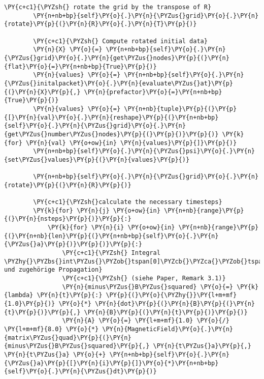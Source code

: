 \begin{Verbatim}[commandchars=\\\{\}]
        \PY{c+c1}{\PYZsh{} rotate the grid by the transpose of R}
        \PY{n+nb+bp}{self}\PY{o}{.}\PY{n}{\PYZus{}grid}\PY{o}{.}\PY{n}{rotate}\PY{p}{(}\PY{n}{R}\PY{o}{.}\PY{n}{T}\PY{p}{)}

        \PY{c+c1}{\PYZsh{} Compute rotated initial data}
        \PY{n}{X} \PY{o}{=} \PY{n+nb+bp}{self}\PY{o}{.}\PY{n}{\PYZus{}grid}\PY{o}{.}\PY{n}{get\PYZus{}nodes}\PY{p}{(}\PY{n}{flat}\PY{o}{=}\PY{n+nb+bp}{True}\PY{p}{)}
        \PY{n}{values} \PY{o}{=} \PY{n+nb+bp}{self}\PY{o}{.}\PY{n}{\PYZus{}initalpacket}\PY{o}{.}\PY{n}{evaluate\PYZus{}at}\PY{p}{(}\PY{n}{X}\PY{p}{,} \PY{n}{prefactor}\PY{o}{=}\PY{n+nb+bp}{True}\PY{p}{)}
        \PY{n}{values} \PY{o}{=} \PY{n+nb}{tuple}\PY{p}{(}\PY{p}{[}\PY{n}{val}\PY{o}{.}\PY{n}{reshape}\PY{p}{(}\PY{n+nb+bp}{self}\PY{o}{.}\PY{n}{\PYZus{}grid}\PY{o}{.}\PY{n}{get\PYZus{}number\PYZus{}nodes}\PY{p}{(}\PY{p}{)}\PY{p}{)} \PY{k}{for} \PY{n}{val} \PY{o+ow}{in} \PY{n}{values}\PY{p}{]}\PY{p}{)}
        \PY{n+nb+bp}{self}\PY{o}{.}\PY{n}{\PYZus{}psi}\PY{o}{.}\PY{n}{set\PYZus{}values}\PY{p}{(}\PY{n}{values}\PY{p}{)}

        \PY{n+nb+bp}{self}\PY{o}{.}\PY{n}{\PYZus{}grid}\PY{o}{.}\PY{n}{rotate}\PY{p}{(}\PY{n}{R}\PY{p}{)}

        \PY{c+c1}{\PYZsh{}calculate the necessary timesteps}
        \PY{k}{for} \PY{n}{j} \PY{o+ow}{in} \PY{n+nb}{range}\PY{p}{(}\PY{n}{nsteps}\PY{p}{)}\PY{p}{:}
            \PY{k}{for} \PY{n}{i} \PY{o+ow}{in} \PY{n+nb}{range}\PY{p}{(}\PY{n+nb}{len}\PY{p}{(}\PY{n+nb+bp}{self}\PY{o}{.}\PY{n}{\PYZus{}a}\PY{p}{)}\PY{p}{)}\PY{p}{:}
                \PY{c+c1}{\PYZsh{} Integral \PYZhy{}\PYZbs{}int\PYZus{}\PYZob{}tspan[0]\PYZcb{}\PYZca{}\PYZob{}tspan[1]\PYZcb{}B\PYZca{}2(s)ds und zugehörige Propagation}
                \PY{c+c1}{\PYZsh{} (siehe Paper, Remark 3.1)}
                \PY{n}{minus\PYZus{}B\PYZus{}squared} \PY{o}{=} \PY{k}{lambda} \PY{n}{t}\PY{p}{:} \PY{p}{(}\PY{o}{\PYZhy{}}\PY{l+m+mf}{1.0}\PY{p}{)} \PY{o}{*} \PY{n}{dot}\PY{p}{(}\PY{n}{B}\PY{p}{(}\PY{n}{t}\PY{p}{)}\PY{p}{,} \PY{n}{B}\PY{p}{(}\PY{n}{t}\PY{p}{)}\PY{p}{)}
                \PY{n}{A} \PY{o}{=} \PY{l+m+mf}{1.0} \PY{o}{/} \PY{l+m+mf}{8.0} \PY{o}{*} \PY{n}{MagneticField}\PY{o}{.}\PY{n}{matrix\PYZus{}quad}\PY{p}{(}\PY{n}{minus\PYZus{}B\PYZus{}squared}\PY{p}{,} \PY{n}{t\PYZus{}a}\PY{p}{,} \PY{n}{t\PYZus{}a} \PY{o}{+} \PY{n+nb+bp}{self}\PY{o}{.}\PY{n}{\PYZus{}a}\PY{p}{[}\PY{n}{i}\PY{p}{]}\PY{o}{*}\PY{n+nb+bp}{self}\PY{o}{.}\PY{n}{\PYZus{}dt}\PY{p}{)}


\end{Verbatim}
